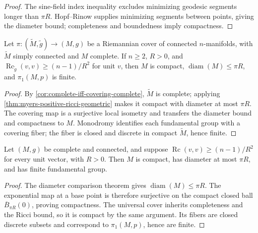 \begin{proof}

\sketch
The sine-field index inequality excludes minimizing geodesic segments longer
than $\pi R$.  Hopf--Rinow supplies minimizing segments between points, giving
the diameter bound; completeness and boundedness imply compactness.
\end{proof}

\begin{theorem}
\label{thm:myers-explicit-simply-connected-cover}





Let $\pi:(\widetilde M,\widetilde g)\to(M,g)$ be a Riemannian cover of
connected $n$-manifolds, with $\widetilde M$ simply connected and $M$ complete.
If $n\geq2$, $R>0$, and
$\operatorname{Rc}_{\widetilde g}(v,v)\geq(n-1)/R^2$ for unit $v$, then $M$ is
compact, $\operatorname{diam}(M)\leq\pi R$, and $\pi_1(M,p)$ is finite.
\end{theorem}

\begin{proof}

\sketch
By \cref{cor:complete-iff-covering-complete}, $\widetilde M$ is complete;
applying \cref{thm:myers-positive-ricci-geometric} makes it compact with
diameter at most $\pi R$.  The covering map is a
surjective local isometry and transfers the diameter bound and compactness to
$M$.  Monodromy identifies each fundamental group with a covering fiber; the
fiber is closed and discrete in compact $\widetilde M$, hence finite.
\end{proof}

\begin{theorem}[Myers]
\label{thm:myers-positive-ricci}



Let $(M,g)$ be complete and connected, and suppose
$\operatorname{Rc}(v,v)\geq(n-1)/R^2$ for every unit vector, with $R>0$.  Then
$M$ is compact, has diameter at most $\pi R$, and has finite fundamental group.
\end{theorem}

\begin{proof}
\sketch
The diameter comparison theorem gives $\operatorname{diam}(M)\leq\pi R$.
The exponential map at a base point is therefore surjective on the compact
closed ball $\overline B_{\pi R}(0)$, proving compactness.  The universal cover
inherits completeness and the Ricci bound, so it is compact by the same
argument.  Its fibers are closed discrete subsets and correspond to
$\pi_1(M,p)$, hence are finite.
\end{proof}

